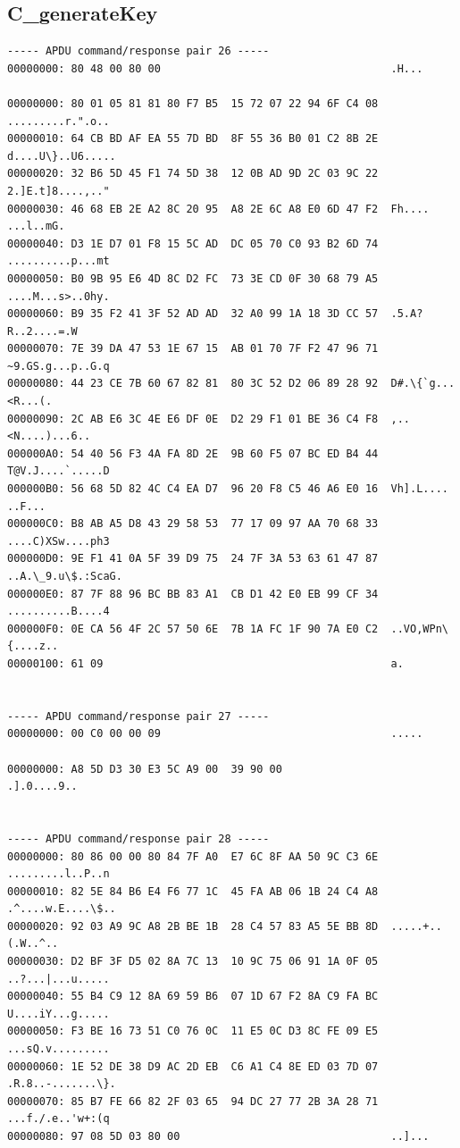 \documentclass[bsc,frontabs,twoside,singlespacing,parskip,deptreport]{infthesis}     %
\begin{document}
\begin{appendices}
\section{C\_generateKey}
\begin{Verbatim}[commandchars=\\\{\}, fontsize=\small]
----- APDU command/response pair 26 -----
00000000: 80 48 00 80 00                                    .H...

00000000: 80 01 05 81 81 80 F7 B5  15 72 07 22 94 6F C4 08  .........r.".o..
00000010: 64 CB BD AF EA 55 7D BD  8F 55 36 B0 01 C2 8B 2E  d....U\}..U6.....
00000020: 32 B6 5D 45 F1 74 5D 38  12 0B AD 9D 2C 03 9C 22  2.]E.t]8....,.."
00000030: 46 68 EB 2E A2 8C 20 95  A8 2E 6C A8 E0 6D 47 F2  Fh.... ...l..mG.
00000040: D3 1E D7 01 F8 15 5C AD  DC 05 70 C0 93 B2 6D 74  ..........p...mt
00000050: B0 9B 95 E6 4D 8C D2 FC  73 3E CD 0F 30 68 79 A5  ....M...s>..0hy.
00000060: B9 35 F2 41 3F 52 AD AD  32 A0 99 1A 18 3D CC 57  .5.A?R..2....=.W
00000070: 7E 39 DA 47 53 1E 67 15  AB 01 70 7F F2 47 96 71  ~9.GS.g...p..G.q
00000080: 44 23 CE 7B 60 67 82 81  80 3C 52 D2 06 89 28 92  D#.\{`g...<R...(.
00000090: 2C AB E6 3C 4E E6 DF 0E  D2 29 F1 01 BE 36 C4 F8  ,..<N....)...6..
000000A0: 54 40 56 F3 4A FA 8D 2E  9B 60 F5 07 BC ED B4 44  T@V.J....`.....D
000000B0: 56 68 5D 82 4C C4 EA D7  96 20 F8 C5 46 A6 E0 16  Vh].L.... ..F...
000000C0: B8 AB A5 D8 43 29 58 53  77 17 09 97 AA 70 68 33  ....C)XSw....ph3
000000D0: 9E F1 41 0A 5F 39 D9 75  24 7F 3A 53 63 61 47 87  ..A.\_9.u\$.:ScaG.
000000E0: 87 7F 88 96 BC BB 83 A1  CB D1 42 E0 EB 99 CF 34  ..........B....4
000000F0: 0E CA 56 4F 2C 57 50 6E  7B 1A FC 1F 90 7A E0 C2  ..VO,WPn\{....z..
00000100: 61 09                                             a.


----- APDU command/response pair 27 -----
00000000: 00 C0 00 00 09                                    .....

00000000: A8 5D D3 30 E3 5C A9 00  39 90 00                 .].0....9..


----- APDU command/response pair 28 -----
00000000: 80 86 00 00 80 84 7F A0  E7 6C 8F AA 50 9C C3 6E  .........l..P..n
00000010: 82 5E 84 B6 E4 F6 77 1C  45 FA AB 06 1B 24 C4 A8  .^....w.E....\$..
00000020: 92 03 A9 9C A8 2B BE 1B  28 C4 57 83 A5 5E BB 8D  .....+..(.W..^..
00000030: D2 BF 3F D5 02 8A 7C 13  10 9C 75 06 91 1A 0F 05  ..?...|...u.....
00000040: 55 B4 C9 12 8A 69 59 B6  07 1D 67 F2 8A C9 FA BC  U....iY...g.....
00000050: F3 BE 16 73 51 C0 76 0C  11 E5 0C D3 8C FE 09 E5  ...sQ.v.........
00000060: 1E 52 DE 38 D9 AC 2D EB  C6 A1 C4 8E ED 03 7D 07  .R.8..-.......\}.
00000070: 85 B7 FE 66 82 2F 03 65  94 DC 27 77 2B 3A 28 71  ...f./.e..'w+:(q
00000080: 97 08 5D 03 80 00                                 ..]...


\end{Verbatim}
\end{appendices}
\end{document}
